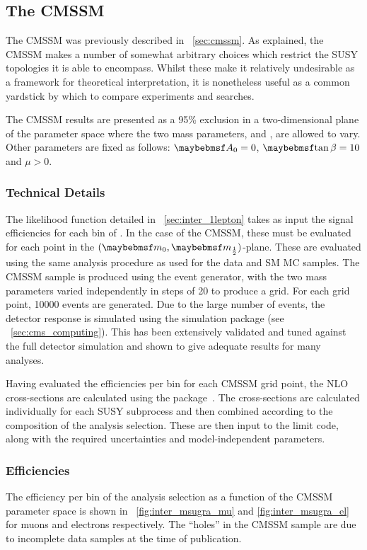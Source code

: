 \subsection{The \ac{CMSSM}}
The \ac{CMSSM} was previously described in \sec~\ref{sec:cmssm}. As explained,
the \ac{CMSSM} makes a number of somewhat arbitrary choices which restrict the
\ac{SUSY} topologies it is able to encompass. Whilst these make it relatively
undesirable as a framework for theoretical interpretation, it is nonetheless
useful as a common yardstick by which to compare experiments and searches.

The \ac{CMSSM} results are presented as a 95\% exclusion in a two-dimensional
plane of the parameter space where the two mass parameters, \Mzero and \Mhalf,
are allowed to vary. Other parameters are fixed as follows: $\Azero = 0$,
$\tanbeta = 10$ and $\mu > 0$.

\subsubsection{Technical Details}
The likelihood function detailed in \sec~\ref{sec:inter_1lepton} takes as input
the signal efficiencies for each bin of \STlep. In the case of the \ac{CMSSM},
these must be evaluated for each point in the $(\Mzero, \Mhalf)$-plane. These
are evaluated using the same analysis procedure as used for the data and \ac{SM}
\ac{MC} samples. The \ac{CMSSM} sample is produced using the \pythia event
generator, with the two mass parameters varied independently in steps of
\unit{20}{\GeV} to produce a grid. For each grid point, 10000 events are
generated. Due to the large number of events, the detector response is simulated
using the \fastsim simulation package (see \sec~\ref{sec:cms_computing}). This
has been extensively validated and tuned against the full detector simulation
and shown to give adequate results for many analyses.

Having evaluated the efficiencies per \STlep bin for each \ac{CMSSM} grid point,
the \ac{NLO} cross-sections are calculated using the \prospino
package~\cite{prospino}. The cross-sections are calculated individually for each
\ac{SUSY} subprocess and then combined according to the composition of the
analysis selection. These are then input to the limit code, along with the
required uncertainties and model-independent parameters.

\subsubsection{Efficiencies}
The efficiency per \STlep bin of the analysis selection as a function of the
\ac{CMSSM} parameter space is shown in \figs~\ref{fig:inter_msugra_mu} and
\ref{fig:inter_msugra_el} for muons and electrons respectively. The ``holes'' in
the \ac{CMSSM} sample are due to incomplete data samples at the time of
publication.

